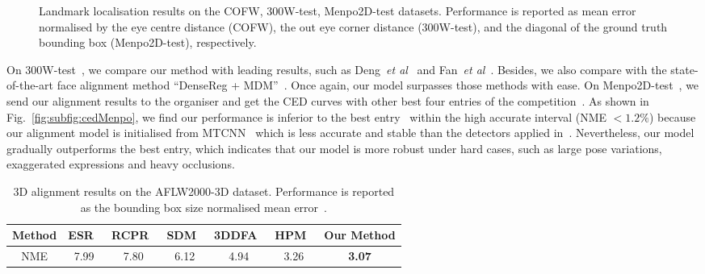 \documentclass{bmvc2k}
\def\etal{\emph{et al}\bmvaOneDot}
\begin{document}
\begin{figure*}[h!]
\centering
{}
\caption{Landmark localisation results on the COFW, 300W-test, Menpo2D-test datasets. Performance is reported as mean error normalised by the eye centre distance (COFW), the out eye corner distance (300W-test), and the diagonal of the ground truth bounding box (Menpo2D-test), respectively.}
\vspace{-4mm}
\label{fig:ced}
\end{figure*}





On 300W-test~\cite{sagonas2016300}, we compare our method with leading results, such as Deng~\etal~\cite{deng2016m} and Fan~\etal~\cite{fan2016approaching}. Besides, we also compare with the state-of-the-art face alignment method ``DenseReg + MDM''~\cite{guler2016densereg}. Once again, our model surpasses those methods with ease. On Menpo2D-test~\cite{stefanos20173Dmenpo}, we send our alignment results to the organiser and get the CED curves with other best four entries of the competition~\cite{stefanos2017menpo}. As shown in Fig.~\ref{fig:subfig:cedMenpo}, we find our performance is inferior to the best entry~\cite{yang2017stacked} within the high accurate interval (NME $<1.2\%$) because our alignment model is initialised from MTCNN~\cite{zhang2016joint} which is less accurate and stable than the detectors applied in~\cite{yang2017stacked}. Nevertheless, our model gradually outperforms the best entry, which indicates that our model is more robust under hard cases, such as large pose variations, exaggerated expressions and heavy occlusions. 

\begin{table}[h!]
\begin{center}
\begin{tabular}{c|c|c|c|c|c|c}
\hline
Method  & ESR~\cite{cao2012face} & RCPR~\cite{burgos2013robust} & SDM~\cite{xiong2013supervised} & 3DDFA~\cite{zhu2016face} & HPM~\cite{bulat2017binarized} &  Our Method  \\
\hline
NME   & 7.99   & 7.80  & 6.12  & 4.94  & 3.26 & {\bf 3.07}\\
\hline
\end{tabular}
\end{center}
\vspace{-2mm}
\caption{3D alignment results on the AFLW2000-3D dataset. Performance is reported as the bounding box size normalised mean error~\cite{zhu2016face}.}
\vspace{-6mm}
\label{table:AFLW20003D}
\end{table}
\end{document}
